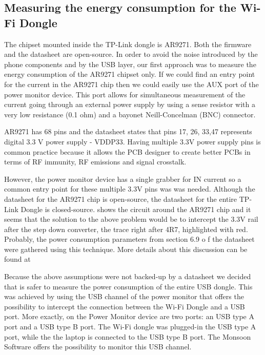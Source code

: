 \subsection{Measuring the energy consumption for the Wi-Fi Dongle}
\label{sec:dongleenergy}

The chipset mounted inside the TP-Link dongle is AR9271. Both the firmware \cite{cite-firmware} and the datasheet are open-source. In order to avoid the noise introduced by the phone components and by the USB layer, our first approach was to measure the energy consumption of the AR9271 chipset only. If we could find an entry point for the current in the AR9271 chip then we could easily use the AUX port of the power monitor device. This port allows for simultaneous measurement of the current going through an external power supply by using a sense resistor with a very low resistance (0.1 ohm) and a bayonet Neill-Concelman (BNC) connector.

AR9271 has 68 pins and the datasheet states that pins 17, 26, 33,47 represents digital 3.3 V power supply - VDDP33. Having multiple 3.3V power supply pins is common practice because it allows the PCB designer to create better PCBs in terms of RF immunity, RF emissions and signal crosstalk. 


However, the power monitor device has a single grabber for IN current so a common entry point for these multiple 3.3V pins was was needed. Although the datasheet for the AR9271 chip is open-source, the datasheet for the entire TP-Link Dongle is closed-source.  shows the circuit around the AR9271 chip and it seems that the solution to the above problem would be to intercept the 3.3V rail after the step down converter, the trace right after 4R7, highlighted with red. Probably, the power consumption parameters from section 6.9 o f the datasheet were gathered using this technique. More details about this discussion can be found at \cite{cite-ar9271} 

Because the above assumptions were not backed-up by a datasheet we decided that is safer to measure the power consumption of the entire USB dongle. This was achieved by using the USB channel of the power monitor that offers the possibility to intercept the connection between the Wi-Fi Dongle and a USB port. More exactly, on the Power Monitor device are two ports: an USB type A port and a USB type B port. The Wi-Fi dongle was plugged-in the USB type A port, while the the laptop is connected to the USB type B port. The Monsoon Software offers the possibility to monitor this  USB channel.

